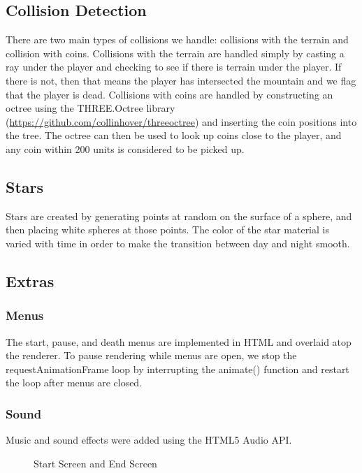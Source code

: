 \documentclass{article}
\begin{document}
\subsection{Collision Detection}
There are two main types of collisions we handle: collisions with the terrain and collision with coins. Collisions with the terrain are handled simply by casting a ray under the player and checking to see if there is terrain under the player. If there is not, then that means the player has intersected the mountain and we flag that the player is dead. Collisions with coins are handled by constructing an octree using the THREE.Octree library (\url{https://github.com/collinhover/threeoctree}) and inserting the coin positions into the tree. The octree can then be used to look up coins close to the player, and any coin within 200 units is considered to be picked up.

\subsection{Stars}
Stars are created by generating points at random on the surface of a sphere, and then placing white spheres at those points. The color of the star material is varied with time in order to make the transition between day and night smooth.

\subsection{Extras}
\subsubsection{Menus}
The start, pause, and death menus are implemented in HTML and overlaid atop the renderer. To pause rendering while menus are open, we stop the requestAnimationFrame loop by interrupting the animate() function and restart the loop after menus are closed.
\subsubsection{Sound}
Music and sound effects were added using the HTML5 Audio API.

\begin{figure}[H]
\begin{center}
\caption{Start Screen and End Screen}
\end{center}
\end{figure}
\end{document}
